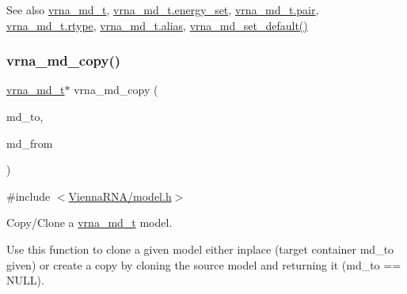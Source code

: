 \begin{DoxySeeAlso}{See also}
\mbox{\hyperlink{group__model__details_ga1f8a10e12a0a1915f2a4eff0b28ea17c}{vrna\+\_\+md\+\_\+t}}, \mbox{\hyperlink{group__model__details_a5eee4e3b468eb690d1407e0178dafb3f}{vrna\+\_\+md\+\_\+t.\+energy\+\_\+set}}, \mbox{\hyperlink{group__model__details_ab4da594c638707e212f64aadb54a7454}{vrna\+\_\+md\+\_\+t.\+pair}}, \mbox{\hyperlink{group__model__details_ad082d0fea31e002b90cdfe5e6382f8b0}{vrna\+\_\+md\+\_\+t.\+rtype}}, \mbox{\hyperlink{group__model__details_a66136cf9abc8ff790ec0d33245d68fd5}{vrna\+\_\+md\+\_\+t.\+alias}}, \mbox{\hyperlink{group__model__details_ga8ac6ff84936282436f822644bf841f66}{vrna\+\_\+md\+\_\+set\+\_\+default()}} 
\end{DoxySeeAlso}
\mbox{\label{group__model__details_ga619057a740918b5fb01808362bb67aea}} 
\subsubsection{\texorpdfstring{vrna\+\_\+md\+\_\+copy()}{vrna\_md\_copy()}}
{\footnotesize\ttfamily \mbox{\hyperlink{group__model__details_ga1f8a10e12a0a1915f2a4eff0b28ea17c}{vrna\+\_\+md\+\_\+t}}$\ast$ vrna\+\_\+md\+\_\+copy (\begin{DoxyParamCaption}\item[{\mbox{\hyperlink{group__model__details_ga1f8a10e12a0a1915f2a4eff0b28ea17c}{vrna\+\_\+md\+\_\+t}} $\ast$}]{md\+\_\+to,  }\item[{const \mbox{\hyperlink{group__model__details_ga1f8a10e12a0a1915f2a4eff0b28ea17c}{vrna\+\_\+md\+\_\+t}} $\ast$}]{md\+\_\+from }\end{DoxyParamCaption})}



{\ttfamily \#include $<$\mbox{\hyperlink{model_8h}{Vienna\+R\+N\+A/model.\+h}}$>$}



Copy/\+Clone a \mbox{\hyperlink{group__model__details_ga1f8a10e12a0a1915f2a4eff0b28ea17c}{vrna\+\_\+md\+\_\+t}} model. 

Use this function to clone a given model either inplace (target container {\ttfamily md\+\_\+to} given) or create a copy by cloning the source model and returning it ({\ttfamily md\+\_\+to} == N\+U\+LL).


